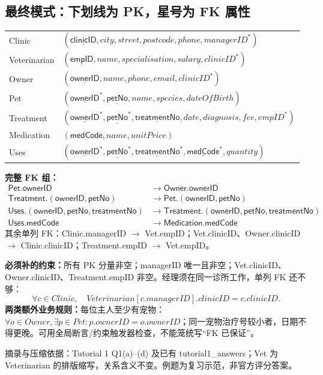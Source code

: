 \documentclass[11pt,a4paper]{article}
\newcommand{\src}[1]{\par\vfill{\footnotesize\color{Muted}摘录与压缩依据：#1。例题为复习示范，非官方评分答案。}}
\newcommand{\pk}[1]{\underline{\mathsf{#1}}}
\begin{document}
\subsection{最终模式：下划线为 PK，星号为 FK 属性}
{\small\begin{tabularx}{\linewidth}{@{}lX@{}}
Clinic & $(\pk{clinicID},city,street,postcode,phone,managerID^*)$\\[3pt]
Veterinarian & $(\pk{empID},name,specialisation,salary,clinicID^*)$\\[3pt]
Owner & $(\pk{ownerID},name,phone,email,clinicID^*)$\\[3pt]
Pet & $(\pk{ownerID}^{*},\pk{petNo},name,species,dateOfBirth)$\\[3pt]
Treatment & $(\pk{ownerID}^{*},\pk{petNo}^{*},\pk{treatmentNo},date,diagnosis,fee,empID^*)$\\[3pt]
Medication & $(\pk{medCode},name,unitPrice)$\\[3pt]
Uses & $(\pk{ownerID}^{*},\pk{petNo}^{*},\pk{treatmentNo}^{*},\pk{medCode}^{*},quantity)$\\
\end{tabularx}}
\textbf{完整 FK 组：}
\begin{align*}
\mathsf{Pet.ownerID}&\to\mathsf{Owner.ownerID}\\
\mathsf{Treatment.(ownerID,petNo)}&\to\mathsf{Pet.(ownerID,petNo)}\\
\mathsf{Uses.(ownerID,petNo,treatmentNo)}&\to\mathsf{Treatment.(ownerID,petNo,treatmentNo)}\\
\mathsf{Uses.medCode}&\to\mathsf{Medication.medCode}
\end{align*}
其余单列 FK：Clinic.managerID $\to$ Vet.empID；Vet.clinicID、Owner.clinicID $\to$ Clinic.clinicID；Treatment.empID $\to$ Vet.empID。\par
\textbf{必须补的约束：}所有 PK 分量非空；managerID 唯一且非空；Vet.clinicID、Owner.clinicID、Treatment.empID 非空。经理须在同一诊所工作，单列 FK 还不够：
\[
\forall c\in Clinic,\quad Veterinarian[c.managerID].clinicID=c.clinicID.
\]
\textbf{两类额外业务规则：}每位主人至少有宠物：$\forall o\in Owner,\exists p\in Pet:p.ownerID=o.ownerID$；同一宠物治疗号较小者，日期不得更晚。可用全局断言/约束触发器检查，不能笼统写“FK 已保证”。
\src{Tutorial 1 Q1(a)--(d) 及已有 tutorial1\_answers；Vet 为 Veterinarian 的排版缩写，关系含义不变}
\end{document}
